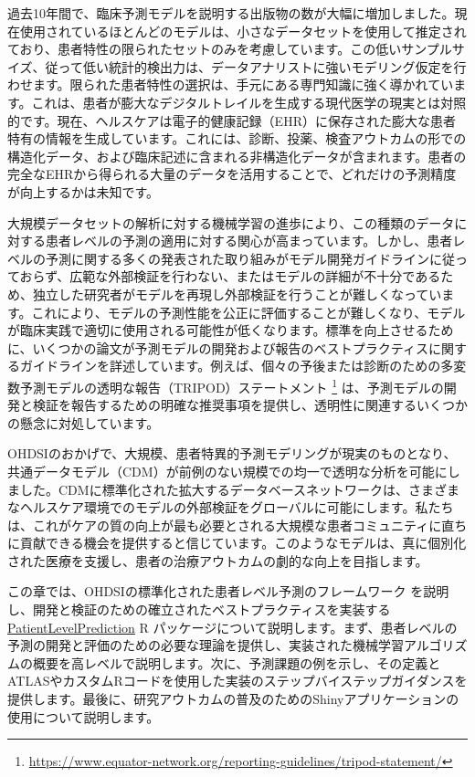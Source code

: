 \documentclass[
  11pt]{book}
\theoremstyle{definition}
\theoremstyle{definition}
\theoremstyle{definition}
\theoremstyle{definition}
\theoremstyle{remark}
\begin{document}
過去10年間で、臨床予測モデルを説明する出版物の数が大幅に増加しました。現在使用されているほとんどのモデルは、小さなデータセットを使用して推定されており、患者特性の限られたセットのみを考慮しています。この低いサンプルサイズ、従って低い統計的検出力は、データアナリストに強いモデリング仮定を行わせます。限られた患者特性の選択は、手元にある専門知識に強く導かれています。これは、患者が膨大なデジタルトレイルを生成する現代医学の現実とは対照的です。現在、ヘルスケアは電子的健康記録（EHR）に保存された膨大な患者特有の情報を生成しています。これには、診断、投薬、検査アウトカムの形での構造化データ、および臨床記述に含まれる非構造化データが含まれます。患者の完全なEHRから得られる大量のデータを活用することで、どれだけの予測精度が向上するかは未知です。 

大規模データセットの解析に対する機械学習の進歩により、この種類のデータに対する患者レベルの予測の適用に対する関心が高まっています。しかし、患者レベルの予測に関する多くの発表された取り組みがモデル開発ガイドラインに従っておらず、広範な外部検証を行わない、またはモデルの詳細が不十分であるため、独立した研究者がモデルを再現し外部検証を行うことが難しくなっています。これにより、モデルの予測性能を公正に評価することが難しくなり、モデルが臨床実践で適切に使用される可能性が低くなります。標準を向上させるために、いくつかの論文が予測モデルの開発および報告のベストプラクティスに関するガイドラインを詳述しています。例えば、個々の予後または診断のための多変数予測モデルの透明な報告（TRIPOD）ステートメント \footnote{\url{https://www.equator-network.org/reporting-guidelines/tripod-statement/}} は、予測モデルの開発と検証を報告するための明確な推奨事項を提供し、透明性に関連するいくつかの懸念に対処しています。  

OHDSIのおかげで、大規模、患者特異的予測モデリングが現実のものとなり、共通データモデル（CDM）が前例のない規模での均一で透明な分析を可能にしました。CDMに標準化された拡大するデータベースネットワークは、さまざまなヘルスケア環境でのモデルの外部検証をグローバルに可能にします。私たちは、これがケアの質の向上が最も必要とされる大規模な患者コミュニティに直ちに貢献できる機会を提供すると信じています。このようなモデルは、真に個別化された医療を支援し、患者の治療アウトカムの劇的な向上を目指します。

この章では、OHDSIの標準化された患者レベル予測のフレームワーク \citep{reps2018} を説明し、開発と検証のための確立されたベストプラクティスを実装する \href{https://ohdsi.github.io/PatientLevelPrediction/}{PatientLevelPrediction} R パッケージについて説明します。まず、患者レベルの予測の開発と評価のための必要な理論を提供し、実装された機械学習アルゴリズムの概要を高レベルで説明します。次に、予測課題の例を示し、その定義とATLASやカスタムRコードを使用した実装のステップバイステップガイダンスを提供します。最後に、研究アウトカムの普及のためのShinyアプリケーションの使用について説明します。
\end{document}
